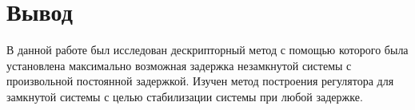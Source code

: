     \section*{Вывод}
    В данной работе был исследован дескрипторный метод с помощью которого была установлена максимально возможная задержка
    незамкнутой системы с произвольной постоянной задержкой. Изучен метод построения регулятора для замкнутой системы с
    целью стабилизации системы при любой задержке.

